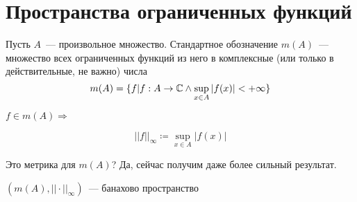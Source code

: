 \documentclass[document]{subfiles}
\begin{document}
\section{Пространства ограниченных функций}
\begin{definition}
    Пусть $A$~--- произвольное множество. Стандартное обозначение $m(A)$~--- множество всех ограниченных функций из него в комплексные (или только в действительные, не важно) числа
    \[ m(A) = \{ f | f: A \rightarrow \mathbb{C} \land \sup_{x \in A} |f(x)| < +\infty \} \]
\end{definition}

\begin{definition}
$f \in m(A) \Rightarrow$

\[||f||_{\infty} \coloneqq \sup_{x \in A} |f(x)|\]
\end{definition}

Это метрика для $m(A)$? Да, сейчас получим даже более сильный результат.

\begin{theorem}
\label{theo:bounded-func-space-is-banach}
    $(m(A), || \cdot ||_{\infty})$~--- банахово пространство
\end{theorem}
\end{document}
